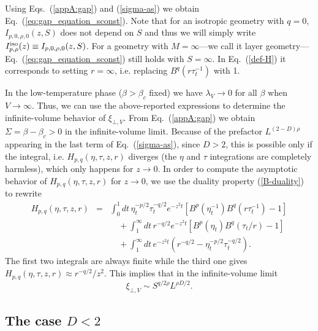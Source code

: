 \documentclass[a4paper,12pt]{article}
\begin{document}
{Using Eqs.~(\ref{appA:gap}) and (\ref{sigma-as}) we obtain 
Eq.~(\ref{eq:gap_equation_sconst}). Note that for an isotropic geometry
with $q=0$, $I_{p,0,\rho,0}(z,S)$ does not depend on $S$ and thus we will
simply write $I^{\rm iso}_{p,\rho}(z) \equiv I_{p,0,\rho,0}(z,S)$. 
For a geometry with $M=\infty$---we call it layer 
geometry---Eq.~(\ref{eq:gap_equation_sconst}) still holds with $S=\infty$.
In Eq.~(\ref{def-H}) it corresponds to setting $r=\infty$, i.e. 
replacing $B^q(r\tau_t^{-1})$ with 1.

In the low-temperature phase ($\beta > \beta_c$ fixed) we have
$\lambda_V\to 0$ for all $\beta$ when 
$V\rightarrow\infty$. Thus, we can use the
above-reported expressions to determine the infinite-volume behavior 
of $\xi_{\bot,V}$.
{}From Eq.~(\ref{appA:gap}) we obtain $\Sigma = \beta - \beta_c > 0$
in the infinite-volume limit. Because of the prefactor $L^{(2-D)\rho}$
appearing in the last term of Eq.~(\ref{sigma-as}), since $D>2$,
this is possible only if the integral, i.e. $H_{p,q}(\eta,\tau,z,r)$ diverges
(the $\eta$ and $\tau$ integrations are completely harmless),
which only happens for $z\to 0$. In order to compute the
asymptotic behavior of $H_{p,q}(\eta,\tau,z,r)$ for $z\to 0$, we use the
duality property (\ref{B-duality}) to rewrite
\begin{eqnarray}
H_{p,q}(\eta,\tau,z,r) &=&
\int_0^1 dt\, \eta_t^{-p/2} \tau_t^{-q/2}  e^{-z^2 t}
\left[ B^{p}\left(\eta_t^{-1}\right) B^q\left(r\tau_t^{-1}\right) 
-1\right]
\nonumber \\
&& \quad
   + \int_1^\infty dt\, r^{-q/2}  e^{-z^2 t}
\left[ B^{p}\left(\eta_t\right) B^q\left(\tau_t/r\right) -1\right]
\nonumber \\
&& \quad
   + \int_1^\infty dt\, e^{-z^2 t}
   \left( r^{-q/2} - \eta_t^{-p/2} \tau_t^{-q/2} \right).
\label{H-expr2}
\end{eqnarray}
The first two integrals are always finite while the third one gives
$H_{p,q}(\eta,\tau,z,r) \approx r^{-q/2}/z^2$.
This implies that in the infinite-volume limit
\begin{equation}
   \label{eq:lowt-scaling}
   \xi_{\bot,V} \sim S^{q/2\rho}L^{\rho D/2}.
\end{equation}

\subsection{The case $D<2$} \label{AppA.2}

}
\end{document}
